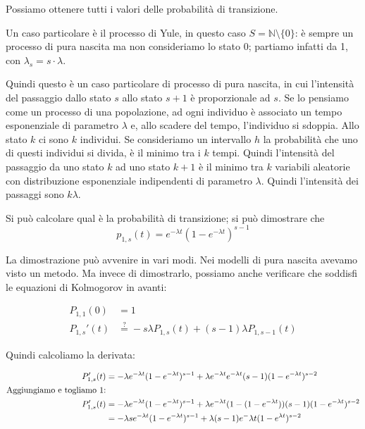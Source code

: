 \documentclass[a4paper,12pt]{book}
\begin{document}
Possiamo ottenere tutti i valori delle probabilità di transizione. 

Un caso particolare è il processo di Yule, in questo caso $ S = \mathbb{N} \setminus \{0\} $: è sempre un processo di pura nascita ma non consideriamo lo stato 0; partiamo infatti da 1, con $\lambda_s = s\cdot \lambda$.

Quindi questo è un caso particolare di processo di pura nascita, in cui l'intensità del passaggio dallo stato $ s $ allo stato $ s+1 $ è proporzionale ad $ s $. Se lo pensiamo come un processo di una popolazione, ad ogni individuo è associato un tempo esponenziale di parametro $\lambda$ e, allo scadere del tempo, l'individuo si sdoppia. Allo stato $ k $ ci sono $ k $ individui. Se consideriamo un intervallo $ h $ la probabilità che uno di questi individui si divida, è il minimo tra i $ k $ tempi. Quindi l'intensità del passaggio da uno stato $ k $ ad uno stato $ k+1 $
è il minimo tra $ k $ variabili aleatorie con distribuzione esponenziale indipendenti di parametro $\lambda$. Quindi l'intensità dei passaggi sono $ k\lambda $. 

Si può calcolare qual è la probabilità di transizione; si può dimostrare che 
$$ p_{1,s}(t) = e^{-\lambda t}(1 - e^{-\lambda t})^{s-1} $$

La dimostrazione può avvenire in vari modi. Nei modelli di pura nascita avevamo visto un metodo. Ma invece di dimostrarlo, possiamo anche verificare che soddisfi le equazioni di Kolmogorov in avanti:

\begin{align*}
	P_{1,1}(0) & = 1 \\
	P_{1,s}'(t) & \overset{?}{=} -s \lambda P_{1,s}(t) + (s-1)\lambda P_{1,s-1}(t)
\end{align*}


Quindi calcoliamo la derivata:

\begin{align*}
	P_{1,s}'(t) & = -\lambda e^{-\lambda t }(1 - e^{-\lambda t})^{s-1} + \lambda e^{-\lambda t} e^{-\lambda t}(s-1)(1-e^{-\lambda t})^{s-2}   \\ 
	\textnormal{Aggiungiamo e togliamo 1:} \\
	P_{1,s}'(t) & = -\lambda e^{-\lambda t }(1 - e^{-\lambda t})^{s-1} + \lambda e^{-\lambda t} (1-(1-e^{-\lambda t}))(s-1)(1-e^{-\lambda t})^{s-2}   \\ 	
	& = -\lambda s e^{-\lambda t}(1 - e^{-\lambda t})^{s-1} + \lambda (s-1) e^-{\lambda t}(1 -e^{\lambda t})^{s-2}
\end{align*}
\end{document}
